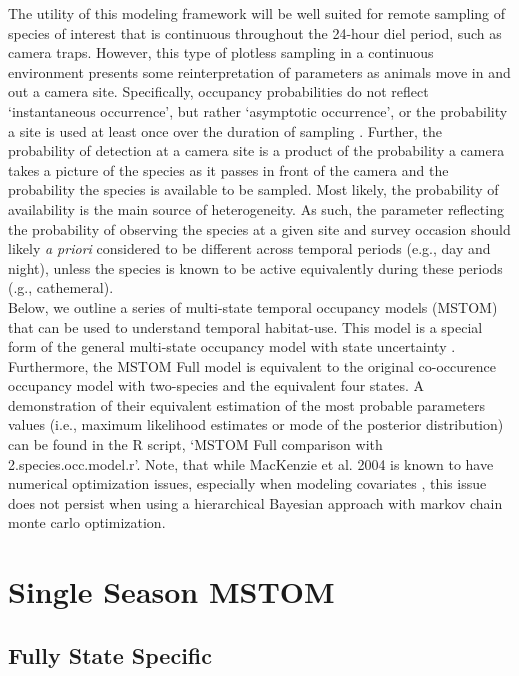\documentclass[12pt]{article}
\begin{document}
The utility of this modeling framework will be well suited for remote sampling of species of interest that is continuous throughout the 24-hour diel period, such as camera traps. However, this type of plotless sampling in a continuous environment presents some reinterpretation of parameters as animals move in and out a camera site. Specifically, occupancy probabilities do not reflect `instantaneous occurrence', but rather `asymptotic occurrence', or the probability a site is used at least once over the duration of sampling \citep{efford2012}. Further, the probability of detection at a camera site is a product of the probability a camera takes a picture of the species as it passes in front of the camera and the probability the species is available to be sampled. Most likely, the probability of availability is the main source of heterogeneity. As such, the parameter reflecting the probability of observing the species at a given site and survey occasion should likely \emph{a priori} considered to be different across temporal periods (e.g., day and night), unless the species is known to be active equivalently during these periods (\emph{}.g., cathemeral).\\

Below, we outline a series of multi-state temporal occupancy models (MSTOM) that can be used to understand temporal habitat-use. This model is a special form of the general multi-state occupancy model with state uncertainty \citep{MacKenzie2009}. Furthermore, the MSTOM Full model is equivalent to the original co-occurence occupancy model \citep{MacKenzie2004} with two-species and the equivalent four states. A demonstration of their equivalent estimation of the most probable parameters values (i.e., maximum likelihood estimates or mode of the posterior distribution) can be found in the R script, `MSTOM Full comparison with 2.species.occ.model.r'. Note, that while MacKenzie et al. 2004 is known to have numerical optimization issues, especially when modeling covariates \citep{MacKenzie2004}, this issue does not persist when using a hierarchical Bayesian approach with markov chain monte carlo optimization.



\section{Single Season MSTOM}
\subsection{Fully State Specific}
\end{document}
